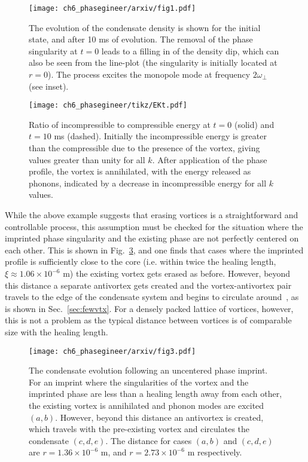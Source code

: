\begin{figure}\centering
    \texttt{[image: ch6\_phasegineer/arxiv/fig1.pdf]}
    \caption{The evolution of the condensate density is shown for the initial state, and after 10 ms of evolution. The removal of the phase singularity at $t=0$ leads to a filling in of the density dip, which can also be seen from the line-plot (the singularity is initially located at $r=0$). The process excites the monopole mode at frequency $2\omega_\perp$ (see inset).}\label{fig:annihilation_1vtx}
\end{figure}
\begin{figure}\centering
    \texttt{[image: ch6\_phasegineer/tikz/EKt.pdf]}
    \caption{Ratio of incompressible to compressible energy at  $t=0$ (solid) and $t=10$ ms (dashed). Initially the incompressible energy is greater than the compressible due to the presence of the vortex, giving values greater than unity for all $k$. After application of the phase profile, the vortex is annihilated, with the energy released as phonons, indicated by a decrease in incompressible energy for all $k$ values.}\label{fig:kinspec}
\end{figure}

While the above example suggests that erasing vortices is a straightforward and controllable process, this assumption must be checked for the situation where the imprinted phase singularity and the existing phase are not perfectly centered on each other. This is shown in Fig.~\ref{fig:annihilation_1vtx_uncentred}, and one finds that cases where the imprinted profile is sufficiently close to the core (i.e. within twice the healing length, $\xi\approx1.06\times 10^{-6}$ m) the existing vortex gets erased as before. However, beyond this distance a separate antivortex gets created and the vortex-antivortex pair travels to the edge of the condensate system and begins to circulate around~\cite{VTX:Martikainen_pra_2001}, as is shown in Sec.~\ref{sec:fewvtx}. For a densely packed lattice of vortices, however, this is not a problem as the typical distance between vortices is of comparable size with the healing length.

\begin{figure}\centering
    \texttt{[image: ch6\_phasegineer/arxiv/fig3.pdf]}
    \caption{The condensate evolution following an uncentered phase imprint. For an imprint where the singularities of the vortex and the imprinted phase are less than a healing length away from each other, the existing vortex is annihilated and phonon modes are excited $(a,b)$. However, beyond this distance an antivortex is created, which travels with the pre-existing vortex and circulates the condensate $(c,d,e)$. The distance for cases $(a,b)$ and $(c,d,e)$ are $r = 1.36\times10^{-6}$ m, and $r =2.73 \times10^{-6}$ m respectively.}\label{fig:annihilation_1vtx_uncentred}
\end{figure}


